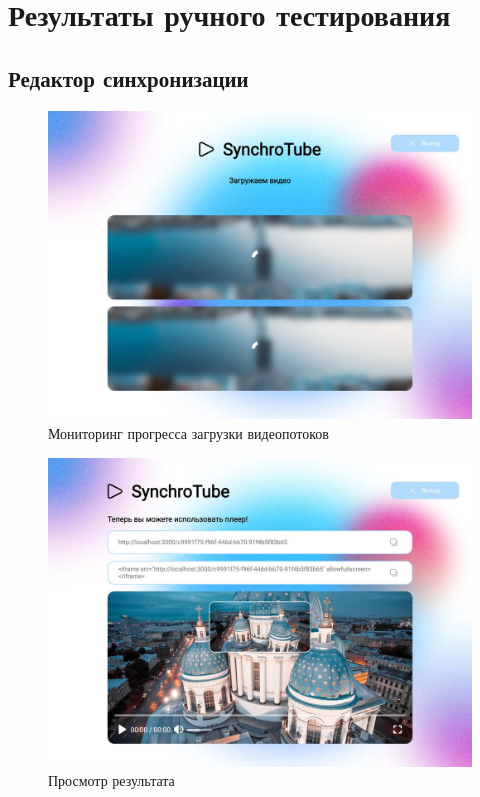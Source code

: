 \chapter{Результаты ручного тестирования}
\label{chap:manual_testing}

	\section{Редактор синхронизации}

	\begin{figure}[ht!]
		\center
		\includegraphics [scale=0.37] {my_folder/images//uploading}
		\caption{Мониторинг прогресса загрузки видеопотоков} 
		\label{fig:uploading}  
	\end{figure}

	\begin{figure}[ht!]
		\center
		\includegraphics [scale=0.37] {my_folder/images//distribution}
		\caption{Просмотр результата} 
		\label{fig:distribution}  
	\end{figure}

